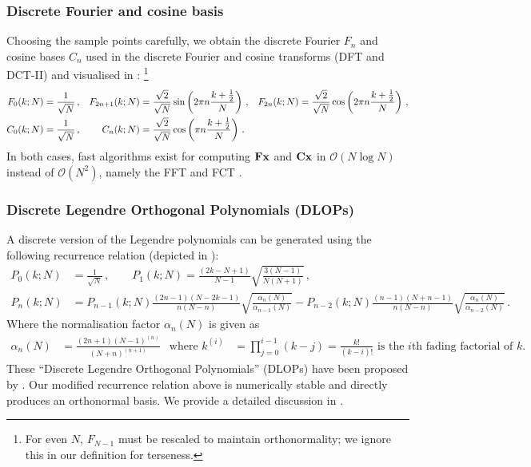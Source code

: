 \subsubsection{Discrete Fourier and cosine basis}
Choosing the sample points carefully, we obtain the discrete Fourier $F_n$ and cosine bases $C_n$ used in the discrete Fourier and cosine transforms (DFT and DCT-II) and visualised in :%
\footnote{
For even $N$, $F_{N - 1}$ must be rescaled to maintain orthonormality; we ignore this in our definition for terseness.
}
\begin{align}
  	F_0(k; N) &= \frac{1}{\sqrt{N}} \,, &
  	F_{2n + 1}(k; N) &= \frac{\sqrt{2}}{\sqrt{N}} \sin\left(
  		2 \pi n \frac{k + \frac{1}2}{N}\right) \,, &
  	F_{2n}(k; N) &= \frac{\sqrt{2}}{\sqrt{N}} \cos\left(
  		2 \pi n \frac{k + \frac{1}2}{N}\right) \,, \notag\\
  	C_0(k; N) &= \frac{1}{\sqrt{N}} \,, &
  	C_n(k; N) &= \frac{\sqrt{2}}{\sqrt{N}} \cos\left(\pi n \frac{k + \frac{1}2}{N}\right) \,.
  	\label{eqn:dft_dct}
\end{align}
In both cases, fast algorithms exist for computing $\mathbf{F} \mathbf{x}$ and $\mathbf{C} \mathbf{x}$ in $\mathcal{O}(N\log{N})$ instead of $\mathcal{O}(N^2)$, namely the FFT and FCT \citep[Chapter~12]{cooley1965algorithm,makhoul1980fast,press2007numerical}.

\subsubsection{Discrete Legendre Orthogonal Polynomials (DLOPs)}
A discrete version of the Legendre polynomials can be generated using the following recurrence relation (depicted in ):
\begin{align*}
  	P_{0}(k; N) &= \frac{1}{\sqrt{N}} \,, \quad\quad
  	P_{1}(k; N)  = \frac{(2 k - N + 1)}{N - 1} \sqrt{\frac{3 (N - 1)}{N (N + 1)}} \,, \\
  	P_{n}(k; N) &= P_{n - 1}(k; N) \frac{(2n - 1) (N - 2k - 1)}{n (N - n)} \sqrt{\frac{\alpha_{n}(N)}{\alpha_{n - 1}(N)}}
                   - P_{n - 2}(k; N) \frac{(n - 1) (N + n - 1)}{n (N - n)} \sqrt{\frac{\alpha_{n}(N)}{\alpha_{n - 2}(N)}} \,.
\end{align*}
Where the normalisation factor $\alpha_n(N)$ is given as
\begin{align*}
 	\alpha_n(N) &= \frac{(2n + 1) (N - 1)^{(n)}}{(N + n)^{(n + 1)}} & \text{where } k^{(i)} &= \prod_{j = 0}^{i - 1} (k - j) = \frac{k!}{(k - i)!} \text{ is the $i$th fading factorial of $k$.}
\end{align*}
These \enquote{Discrete Legendre Orthogonal Polynomials} (DLOPs) have been proposed by \citet{neuman1974discrete}.
Our modified recurrence relation above is numerically stable and directly produces an orthonormal basis.
We provide a detailed discussion in \citet{stockel2021discrete}.

